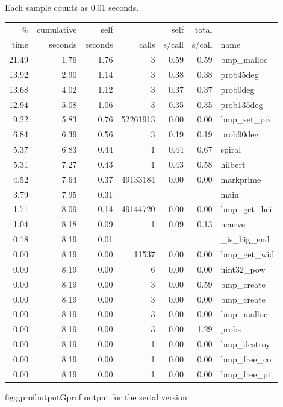 {Each sample counts as 0.01 seconds.
\begin{longtable} {r r r r r r l}
  \%  & cumulative&    self&         &     self&     total& \\%
 time &  seconds &  seconds&    calls&   s/call&   s/call&  name    \\%
 21.49&      1.76&     1.76&        3&     0.59&     0.59&  bmp\_malloc\\%
 13.92&      2.90&     1.14&        3&     0.38&     0.38&  prob45deg\\%
 13.68&      4.02&     1.12&        3&     0.37&     0.37&  prob0deg\\%
 12.94&      5.08&     1.06&        3&     0.35&     0.35&  prob135deg\\%
  9.22&      5.83&     0.76& 52261913&     0.00&     0.00&  bmp\_set\_pix\\%
  6.84&      6.39&     0.56&        3&     0.19&     0.19&  prob90deg\\%
  5.37&      6.83&     0.44&        1&     0.44&     0.67&  spiral\\%
  5.31&      7.27&     0.43&        1&     0.43&     0.58&  hilbert\\%
  4.52&      7.64&     0.37& 49133184&     0.00&     0.00&  markprime\\%
  3.79&      7.95&     0.31&         &         &         &  main\\%
  1.71&      8.09&     0.14& 49144720&     0.00&     0.00&  bmp\_get\_hei\\%
  1.04&      8.18&     0.09&        1&     0.09&     0.13&  ncurve\\%
  0.18&      8.19&     0.01&         &         &         &  \_is\_big\_end\\%
  0.00&      8.19&     0.00&    11537&     0.00&     0.00&  bmp\_get\_wid\\%
  0.00&      8.19&     0.00&        6&     0.00&     0.00&  uint32\_pow\\%
  0.00&      8.19&     0.00&        3&     0.00&     0.59&  bmp\_create\\%
  0.00&      8.19&     0.00&        3&     0.00&     0.00&  bmp\_create\\%
  0.00&      8.19&     0.00&        3&     0.00&     0.00&  bmp\_malloc\\%
  0.00&      8.19&     0.00&        3&     0.00&     1.29&  probs\\%
  0.00&      8.19&     0.00&        1&     0.00&     0.00&  bmp\_destroy\\%
  0.00&      8.19&     0.00&        1&     0.00&     0.00&  bmp\_free\_co\\%
  0.00&      8.19&     0.00&        1&     0.00&     0.00&  bmp\_free\_pi\\%
\end{longtable}}{fig:gprofoutput}{Gprof output for the serial version.}

